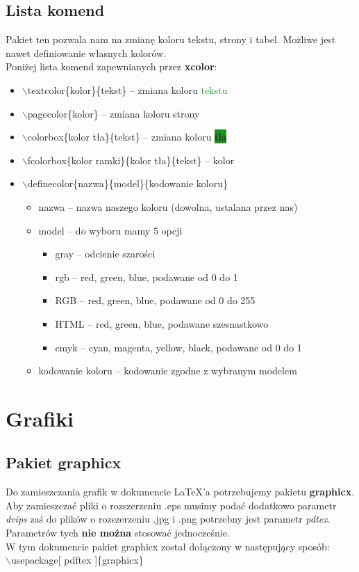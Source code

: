 \documentclass[a4paper, 12pt]{article}
\begin{document}
\subsection{Lista komend}
Pakiet ten pozwala nam na zmianę koloru tekstu, strony i tabel. Możliwe jest nawet definiowanie własnych kolorów.\\
Poniżej lista komend zapewnianych przez \textbf{xcolor}:
\begin{itemize}
	\item $\backslash$textcolor\{kolor\}\{tekst\} -- zmiana koloru \textcolor{ForestGreen}{tekstu}
	\item $\backslash$pagecolor\{kolor\} -- zmiana koloru strony
	\item $\backslash$colorbox\{kolor tła\}\{tekst\} -- zmiana koloru \colorbox{ForestGreen}{tła}
	\item $\backslash$fcolorbox\{kolor ramki\}\{kolor tła\}\{tekst\} -- kolor 
	\item $\backslash$definecolor\{nazwa\}\{model\}\{kodowanie koloru\}
	\begin{itemize}
		\item nazwa -- nazwa naszego koloru (dowolna, ustalana przez nas)
		\item model -- do wyboru mamy 5 opcji
		\begin{itemize}
			\item gray -- odcienie szarości
			\item rgb -- red, green, blue, podawane od 0 do 1
			\item RGB -- red, green, blue, podawane od 0 do 255
			\item HTML --  red, green, blue, podawane szesnastkowo
			\item cmyk -- cyan, magenta, yellow, black, podawane od 0 do 1
		\end{itemize}
		\item kodowanie koloru -- kodowanie zgodne z wybranym modelem
	\end{itemize}
\end{itemize}

\section{Grafiki}
\subsection{Pakiet graphicx}
Do zamieszczania grafik w dokumencie \LaTeX 'a potrzebujemy pakietu \textbf{graphicx}. Aby zamieszczać pliki o rozszerzeniu .eps musimy podać dodatkowo parametr \textit{dvips} zaś do plików o rozszerzeniu .jpg i .png potrzebny jest parametr \textit{pdtex}. Parametrów tych \textbf{nie można} stosować jednocześnie. \\
W tym dokumencie pakiet graphicx został dołączony w następujący sposób: \\
$\backslash$usepackage[ pdftex ]\{graphicx\}
\end{document}
